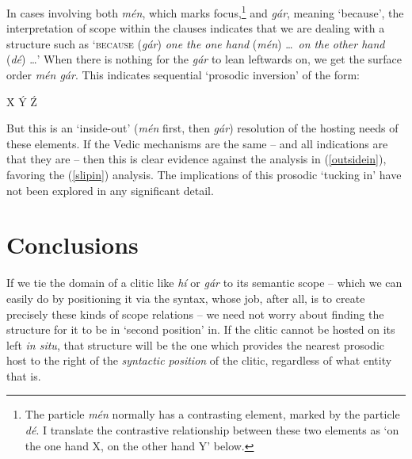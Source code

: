 \documentclass[output=paper,
modfonts
]{LSP/langsci}
\begin{document}
\noindent In cases involving both \textit{mén}, which marks focus,\footnote{The particle \textit{mén} normally has
a contrasting element, marked by the particle \textit{dé}. I translate the contrastive relationship between these two elements
as `on the one hand X, on the other hand Y' below.} and \textit{gár}, meaning `because', the interpretation of scope within the clauses 
indicates that we are dealing with a structure such as `\textsc{because} (\textit{gár}) \textit{one the one hand} (\textit{mén}) \ldots\ \textit{on the other hand} (\textit{dé}) \ldots ' When there is nothing for the \textit{gár} to lean leftwards on, we get
the surface order \textit{mén gár}. This indicates sequential `prosodic inversion' of the form:

\vspace*{3ex}
\begin{exe}\ex
{\ob} {\textcolor{gray}{}} {\ob}{\textcolor{gray}{}} {\ob}\'{X}   \'{Y} \'{Z}{\cb}{\cb}{\cb}  
\end{exe}
\vspace*{1ex}


\noindent But this is an `inside-out' (\textit{mén} first, then \textit{gár}) resolution of the hosting needs of these elements. If the Vedic
mechanisms are the same -- and all indications are that they are -- then this is clear evidence against the analysis in
(\ref{outsidein}), favoring the (\ref{slipin}) analysis. The implications of this prosodic `tucking in' have not been explored in any significant
detail.



\section{Conclusions}

If we tie the domain of a clitic like \textit{hí} or \textit{gár} to its semantic scope -- which we can easily do by
positioning it via the syntax, whose job, after all, is to create precisely these kinds of scope relations -- we
need not worry about finding the structure for it to be in `second position' in. If the clitic cannot be hosted
on its left \textit{in situ}, that structure will be the
one which provides the nearest prosodic host to the right of the \textit{syntactic position} of the clitic,
regardless of what entity that is. 
\end{document}

